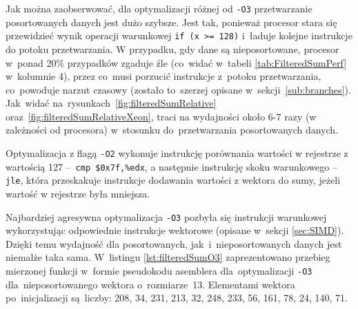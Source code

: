 Jak można zaobserwować, dla optymalizacji różnej od \texttt{-O3} przetwarzanie posortowanych danych jest dużo szybsze. Jest tak, ponieważ procesor stara się przewidzieć wynik operacji warunkowej \mbox{\texttt{if (x >= 128)}} i~ładuje kolejne instrukcje do potoku przetwarzania. W przypadku, gdy dane są nieposortowane, procesor w~ponad 20\% przypadków zgaduje źle (co~widać w~tabeli \ref{tab:FilteredSumPerf} w~kolumnie 4), przez co~musi porzucić instrukcje z~potoku przetwarzania, co~powoduje narzut czasowy (zostało to~szerzej opisane w~sekcji~\ref{sub:branches}). Jak~widać na~rysunkach~\ref{fig:filteredSumRelative} oraz~\ref{fig:filteredSumRelativeXeon}, traci na wydajności około 6-7 razy (w zależności od procesora) w~stosunku do~przetwarzania posortowanych danych.

Optymalizacja z flagą \texttt{-O2} wykonuje instrukcję porównania wartości w rejestrze z wartością 127 --~\texttt{cmp \$0x7f,\%edx}, a następnie instrukcję skoku warunkowego -- \texttt{jle}, która przeskakuje instrukcje dodawania wartości z wektora do sumy, jeżeli wartość w rejestrze była mniejsza.

Najbardziej agresywna optymalizacja \texttt{-O3} pozbyła się instrukcji warunkowej wykorzystując odpowiednie instrukcje wektorowe (opisane w~sekcji \ref{sec:SIMD}). Dzięki temu wydajność dla posortowanych, jak~i~nieposortowanych danych jest niemalże taka sama. W~listingu \ref{lst:filteredSumO3} zaprezentowano przebieg mierzonej funkcji w~formie pseudokodu asemblera dla~optymalizacji \texttt{-O3} dla~nieposortowanego wektora o~rozmiarze~13. Elementami wektora po~inicjalizacji są~liczby: 208, 34, 231, 213, 32, 248, 233, 56, 161, 78, 24, 140, 71.

